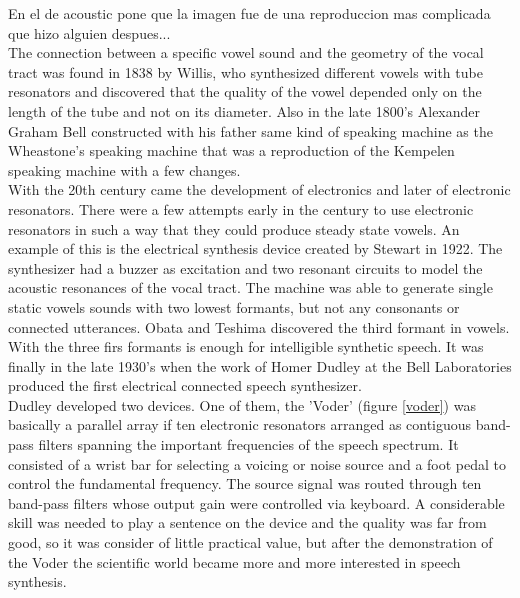 En el de acoustic pone que la imagen fue de una reproduccion mas complicada que hizo alguien despues...\\
The connection between a specific vowel sound and the geometry of the vocal tract was found in 1838 by Willis, who synthesized different vowels with tube resonators and discovered that the quality of the vowel depended only on the length of the tube and not on its diameter.
Also in the late 1800's Alexander Graham Bell constructed with his father same kind of speaking machine as the Wheastone's speaking machine that was a reproduction of the Kempelen speaking machine with a few changes.\\
With the 20th century came the development of electronics and later of electronic resonators. There were a few attempts early in the century to use electronic resonators in such a way that they could produce steady state vowels. An example of this is the electrical synthesis device created by Stewart in 1922. The synthesizer had a buzzer as excitation and two resonant circuits to model the acoustic resonances of the vocal tract. The machine was able to generate single static vowels sounds with two lowest formants, but not any consonants or connected utterances. Obata and Teshima discovered the third formant in vowels. With the three firs formants is enough for intelligible synthetic speech. It was finally in the late 1930's when the work of Homer Dudley at the Bell Laboratories produced the first electrical connected speech synthesizer.\\
Dudley developed two devices. One of them, the 'Voder' (figure \ref{voder}) was basically a parallel array if ten electronic resonators arranged as contiguous band-pass filters spanning  the important frequencies of the speech spectrum. It consisted of a wrist bar for selecting a voicing or noise source and a foot pedal to control the fundamental frequency. The source signal was routed through ten band-pass filters whose output gain were controlled via keyboard. A considerable skill was needed to play a sentence on the device and the quality was far from good, so it was consider of little practical value, but after the demonstration of the Voder the scientific world became more and more interested in speech synthesis.\\
